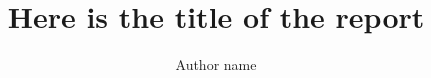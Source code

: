 \documentclass[3p,times,procedia]{elsarticle}
\begin{document}
\begin{frontmatter}



%


\title{\textbf{Here is the title of the report}}




\author{Author name} 

\address{Department of Computer Science, Babe\c s-Bolyai University\\1, M. Kog\u alniceanu Street, 400084, Cluj-Napoca, Romania\\E-mail: .....}

\begin{abstract}

\end{abstract}

\begin{keyword}




\end{keyword}
\end{frontmatter}
\end{document}
